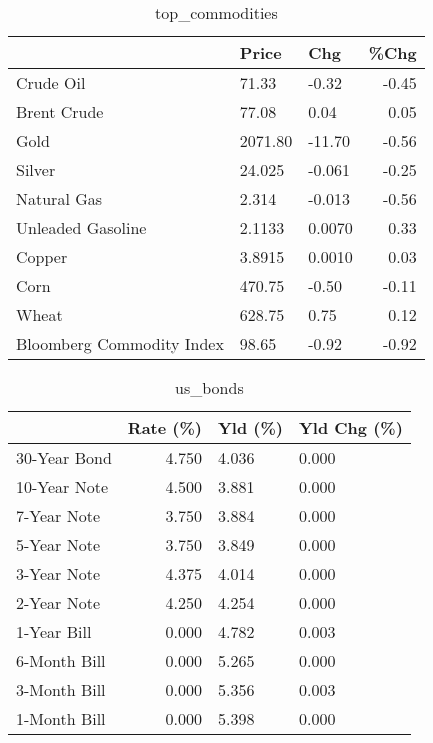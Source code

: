 \documentclass{article}%
\begin{document}
\begin{table}[htbp]%
\caption{top\_commodities}%
\centering%
\begin{adjustbox}{width=1\textwidth}%
\begin{tabular}{lllr}
\toprule
                          &   Price &    Chg &  \%Chg \\
\midrule
               Crude Oil  &   71.33 &  -0.32 & -0.45 \\
             Brent Crude  &   77.08 &   0.04 &  0.05 \\
                    Gold  & 2071.80 & -11.70 & -0.56 \\
                  Silver  &  24.025 & -0.061 & -0.25 \\
             Natural Gas  &   2.314 & -0.013 & -0.56 \\
       Unleaded Gasoline  &  2.1133 & 0.0070 &  0.33 \\
                  Copper  &  3.8915 & 0.0010 &  0.03 \\
                    Corn  &  470.75 &  -0.50 & -0.11 \\
                   Wheat  &  628.75 &   0.75 &  0.12 \\
Bloomberg Commodity Index &   98.65 &  -0.92 & -0.92 \\
\bottomrule
\end{tabular}
%
\end{adjustbox}%
\end{table}

%


\begin{table}[htbp]%
\caption{us\_bonds}%
\centering%
\begin{adjustbox}{width=1\textwidth}%
\begin{tabular}{lrll}
\toprule
             &  Rate (\%) & Yld (\%) & Yld Chg (\%) \\
\midrule
30-Year Bond &     4.750 &   4.036 &       0.000 \\
10-Year Note &     4.500 &   3.881 &       0.000 \\
 7-Year Note &     3.750 &   3.884 &       0.000 \\
 5-Year Note &     3.750 &   3.849 &       0.000 \\
 3-Year Note &     4.375 &   4.014 &       0.000 \\
 2-Year Note &     4.250 &   4.254 &       0.000 \\
 1-Year Bill &     0.000 &   4.782 &       0.003 \\
6-Month Bill &     0.000 &   5.265 &       0.000 \\
3-Month Bill &     0.000 &   5.356 &       0.003 \\
1-Month Bill &     0.000 &   5.398 &       0.000 \\
\bottomrule
\end{tabular}
%
\end{adjustbox}%
\end{table}
\end{document}
